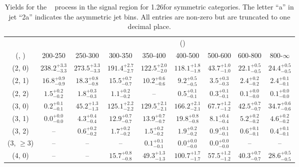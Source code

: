 \begin{table}[h!]
\tiny
\centering
\caption{Yields for the \zInv~ process in the signal region for 1.26\ifb for symmetric categories. The letter ``a'' in jet \eg ``2a''  indicates the asymmetric jet bins. All entries are non-zero but are truncated to one decimal place.\label{tab:yieldssep_zinv_sig_sym}}
\begin{tabular}
{ccccccccc}
	\hline\hline
&	& \multicolumn{8}{c}{\scalht (\gev)} \\ 
	 (\njet,  \nb) & 200-250 & 250-300 & 300-350 & 350-400 & 400-500 & 500-600 & 600-800 & 800-$\infty$ \\ [0.8ex] 
\hline
	(2, 0) & $238.2^{+ 3.3 }_{- 3.3 }$ & $273.5^{+ 3.3 }_{- 3.3 }$ & $191.4^{+ 2.7 }_{- 2.7 }$ & $122.5^{+ 2.0 }_{- 2.0 }$ & $118.1^{+ 1.8 }_{- 1.8 }$ & $43.7^{+ 1.0 }_{- 1.0 }$ & $22.1^{+ 0.5 }_{- 0.5 }$ & $24.4^{+ 0.5 }_{- 0.5 }$ \\[0.5ex] 
	(2, 1) & $16.8^{+ 0.9 }_{- 0.9 }$ & $18.3^{+ 0.8 }_{- 0.8 }$ & $15.5^{+ 0.7 }_{- 0.7 }$ & $10.2^{+ 0.6 }_{- 0.6 }$ & $9.2^{+ 0.5 }_{- 0.5 }$ & $3.5^{+ 0.3 }_{- 0.3 }$ & $2.4^{+ 0.2 }_{- 0.2 }$ & $2.4^{+ 0.1 }_{- 0.1 }$ \\[0.5ex] 
	(2, 2) & $1.5^{+ 0.2 }_{- 0.2 }$ & $1.8^{+ 0.3 }_{- 0.3 }$ & $1.1^{+ 0.2 }_{- 0.2 }$ & -- & $0.5^{+ 0.1 }_{- 0.1 }$ & $0.3^{+ 0.1 }_{- 0.1 }$ & $0.1^{+ 0.0 }_{- 0.0 }$ & $0.1^{+ 0.0 }_{- 0.0 }$ \\[0.5ex] 
	(3, 0) & $0.2^{+ 0.1 }_{- 0.1 }$ & $45.2^{+ 1.3 }_{- 1.3 }$ & $125.1^{+ 2.2 }_{- 2.2 }$ & $129.5^{+ 2.1 }_{- 2.1 }$ & $166.2^{+ 2.1 }_{- 2.1 }$ & $67.7^{+ 1.2 }_{- 1.2 }$ & $42.5^{+ 0.7 }_{- 0.7 }$ & $34.7^{+ 0.6 }_{- 0.6 }$ \\[0.5ex] 
	(3, 1) & $0.0^{+ 0.0 }_{- 0.0 }$ & $4.3^{+ 0.4 }_{- 0.4 }$ & $12.9^{+ 0.7 }_{- 0.7 }$ & $13.9^{+ 0.7 }_{- 0.7 }$ & $19.8^{+ 0.8 }_{- 0.8 }$ & $8.1^{+ 0.4 }_{- 0.4 }$ & $5.2^{+ 0.2 }_{- 0.2 }$ & $4.6^{+ 0.2 }_{- 0.2 }$ \\[0.5ex] 
	(3, 2) & -- & $0.6^{+ 0.2 }_{- 0.2 }$ & $1.7^{+ 0.2 }_{- 0.2 }$ & $1.5^{+ 0.2 }_{- 0.2 }$ & $1.9^{+ 0.2 }_{- 0.2 }$ & $0.9^{+ 0.1 }_{- 0.1 }$ & $0.6^{+ 0.1 }_{- 0.1 }$ & $0.4^{+ 0.1 }_{- 0.1 }$ \\[0.5ex] 
	(3, $\ge3$) & -- & -- & -- & $0.1^{+ 0.1 }_{- 0.1 }$ & $0.0^{+ 0.0 }_{- 0.0 }$ & $0.0^{+ 0.0 }_{- 0.0 }$ & -- & -- \\[0.5ex] 
	(4, 0) & -- & -- & $15.7^{+ 0.8 }_{- 0.8 }$ & $49.3^{+ 1.3 }_{- 1.3 }$ & $100.7^{+ 1.7 }_{- 1.7 }$ & $57.5^{+ 1.2 }_{- 1.2 }$ & $40.3^{+ 0.7 }_{- 0.7 }$ & $28.6^{+ 0.5 }_{- 0.5 }$ \\[0.5ex] 

\end{tabular}
\end{table}
